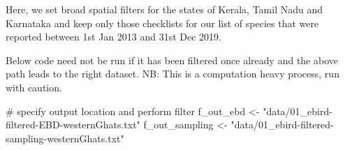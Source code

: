 \documentclass[]{article}
\newenvironment{Shaded}{}{}
\newcommand{\CommentTok}[1]{\textcolor[rgb]{0.00,0.50,0.00}{#1}}
\newcommand{\DataTypeTok}[1]{#1}
\newcommand{\KeywordTok}[1]{\textcolor[rgb]{0.00,0.00,1.00}{#1}}
\newcommand{\NormalTok}[1]{#1}
\newcommand{\OperatorTok}[1]{#1}
\newcommand{\StringTok}[1]{\textcolor[rgb]{0.00,0.50,0.50}{#1}}
\begin{document}
\begin{Shaded}
\end{Shaded}

Here, we set broad spatial filters for the states of Kerala, Tamil Nadu and Karnataka and keep only those checklists for our list of species that were reported between 1st Jan 2013 and 31st Dec 2019.

\begin{Shaded}
\end{Shaded}

Below code need not be run if it has been filtered once already and the above path leads to the right dataset. NB: This is a computation heavy process, run with caution.

\begin{Shaded}
\begin{Highlighting}[numbers=left,,]
\CommentTok{# specify output location and perform filter}
\NormalTok{f_out_ebd <-}\StringTok{ "data/01_ebird-filtered-EBD-westernGhats.txt"}
\NormalTok{f_out_sampling <-}\StringTok{ "data/01_ebird-filtered-sampling-westernGhats.txt"}
\end{Highlighting}
\end{Shaded}
\end{document}
